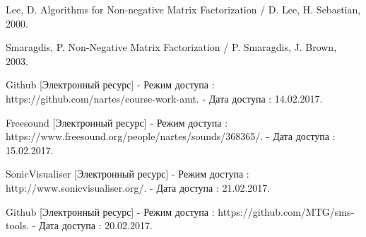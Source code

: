 \documentclass[oneside, final, 12pt]{extarticle}
\begin{document}
\begin{thebibliography}{0}






   Lee, D. Algorithms for Non-negative Matrix Factorization /
    D. Lee, H. Sebastian, 2000.

   Smaragdis, P. Non-Negative Matrix Factorization /
    P. Smaragdis, J. Brown, 2003.







    Github [Электронный ресурс] - Режим доступа :
    https://github.com/nartes/course-work-amt. -
    Дата доступа : 14.02.2017.

    Freesound [Электронный ресурс] - Режим доступа :
    https://www.freesound.org/people/nartes/sounds/368365/. -
    Дата доступа : 15.02.2017.

    SonicVisualiser [Электронный ресурс] - Режим доступа :
    http://www.sonicvisualiser.org/. -
    Дата доступа : 21.02.2017.

    Github [Электронный ресурс] - Режим доступа :
    https://github.com/MTG/sms-tools. -
    Дата доступа : 20.02.2017.


\end{thebibliography}
\end{document}
